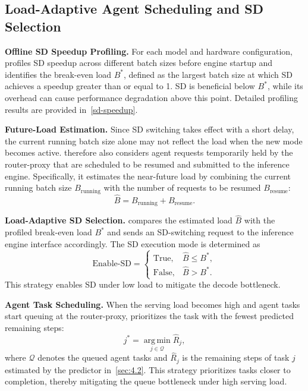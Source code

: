 \subsection{Load-Adaptive Agent Scheduling and SD Selection}
\label{sec:4.3}

\textbf{Offline SD Speedup Profiling.}
\label{sec:4.3.1}
For each model and hardware configuration, \sysname profiles SD speedup across different batch sizes before engine startup and identifies the break-even load $B^{*}$, defined as the largest batch size at which SD achieves a speedup greater than or equal to 1. 
SD is beneficial below $B^{*}$, while its overhead can cause performance degradation above this point. Detailed profiling results are provided in~\autoref{sd-speedup}.

\textbf{Future-Load Estimation.}
Since SD switching takes effect with a short delay, the current running batch size alone may not reflect the load when the new mode becomes active. 
\sysname therefore also considers agent requests temporarily held by the router-proxy that are scheduled to be resumed and submitted to the inference engine. 
Specifically, it estimates the near-future load by combining the current running batch size $B_{\mathrm{running}}$ with the number of requests to be resumed $B_{\mathrm{resume}}$:
\begin{equation}
\hat{B}=B_{\mathrm{running}}+B_{\mathrm{resume}}.
\end{equation}

\textbf{Load-Adaptive SD Selection.}
\sysname compares the estimated load $\hat{B}$ with the profiled break-even load $B^{*}$ and sends an SD-switching request to the inference engine interface accordingly. The SD execution mode is determined as
\begin{equation}
\mathrm{Enable\mbox{-}SD} =
\begin{cases}
\mathrm{True},  & \hat{B} \leq B^{*}, \\
\mathrm{False}, & \hat{B} > B^{*}.
\end{cases}
\end{equation}
This strategy enables SD under low load to mitigate the decode bottleneck.

\textbf{Agent Task Scheduling.}
When the serving load becomes high and agent tasks start queuing at the router-proxy, \sysname prioritizes the task with the fewest predicted remaining steps:
\begin{equation}
j^{*} =
\operatorname*{arg\,min}_{j \in \mathcal{Q}}
\hat{R}_{j},
\end{equation}
where $\mathcal{Q}$ denotes the queued agent tasks and $\hat{R}_{j}$ is the remaining steps of task $j$ estimated by the predictor in~\autoref{sec:4.2}.
This strategy prioritizes tasks closer to completion, thereby mitigating the queue bottleneck under high serving load.